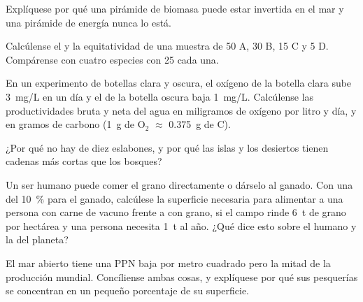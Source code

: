 \begin{exercise}[$\star\star$]\label{exo:b1:ecosystem-organization:6}
Explíquese por qué una pirámide de biomasa puede estar invertida en el mar y
una pirámide de energía nunca lo está.
\end{exercise}

\begin{exercise}[$\star\star$]\label{exo:b1:ecosystem-organization:7}
Calcúlense el  y la equitatividad de una muestra de 50 A,
30 B, 15 C y 5 D. Compárense con cuatro especies con 25 cada una.
\end{exercise}

\begin{exercise}[$\star\star$]\label{exo:b1:ecosystem-organization:8}
En un experimento de botellas clara y oscura, el oxígeno de la botella clara
sube \qty{3}{mg/L} en un día y el de la botella oscura baja \qty{1}{mg/L}.
Calcúlense las productividades bruta y neta del agua en miligramos de
oxígeno por litro y día, y en gramos de carbono (\qty{1}{g} de
$\mathrm{O_2}$ $\approx$ \qty{0.375}{g} de C).
\end{exercise}

\begin{exercise}[$\star\star$]\label{exo:b1:ecosystem-organization:9}
¿Por qué no hay  de diez eslabones, y por qué las islas
y los desiertos tienen cadenas más cortas que los bosques?
\end{exercise}

\begin{exercise}[$\star\star\star$]\label{exo:b1:ecosystem-organization:10}
Un ser humano puede comer el grano directamente o dárselo al ganado. Con una
 del \qty{10}{\%} para el ganado, calcúlese la superficie
necesaria para alimentar a una persona con carne de vacuno frente a con
grano, si el campo rinde \qty{6}{t} de grano por hectárea y una persona
necesita \qty{1}{t} al año. ¿Qué dice esto sobre el  humano y
la  del planeta?
\end{exercise}

\begin{exercise}[$\star\star\star$]\label{exo:b1:ecosystem-organization:11}
El mar abierto tiene una PPN baja por metro cuadrado pero la mitad de la
producción mundial. Concíliense ambas cosas, y explíquese por qué sus
pesquerías se concentran en un pequeño porcentaje de su superficie.
\end{exercise}

